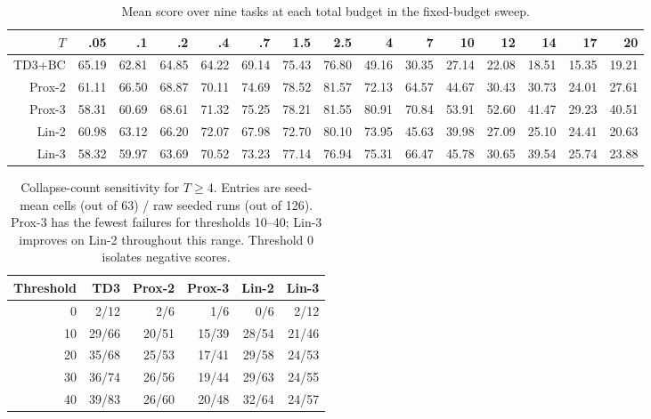 \documentclass[letterpaper]{article}
\begin{document}
\begin{table}[t]
\centering
\small
\setlength{\tabcolsep}{4.5pt}
\begin{tabular}{r|rrrrrrrrrrrrrr}
\toprule
$T$&.05&.1&.2&.4&.7&1.5&2.5&4&7&10&12&14&17&20\\
\midrule
TD3+BC&65.19&62.81&64.85&64.22&69.14&75.43&76.80&49.16&30.35&27.14&22.08&18.51&15.35&19.21\\
Prox-2&61.11&66.50&68.87&70.11&74.69&78.52&81.57&72.13&64.57&44.67&30.43&30.73&24.01&27.61\\
Prox-3&58.31&60.69&68.61&71.32&75.25&78.21&81.55&80.91&70.84&53.91&52.60&41.47&29.23&40.51\\
Lin-2&60.98&63.12&66.20&72.07&67.98&72.70&80.10&73.95&45.63&39.98&27.09&25.10&24.41&20.63\\
Lin-3&58.32&59.97&63.69&70.52&73.23&77.14&76.94&75.31&66.47&45.78&30.65&39.54&25.74&23.88\\
\bottomrule
\end{tabular}
\caption{Mean score over nine tasks at each total budget in the fixed-budget sweep.}
\label{tab:tau_means}
\end{table}

\begin{table}[t]
\centering
\small
\begin{tabular}{r|rrrrr}
\toprule
Threshold & TD3 & Prox-2 & Prox-3 & Lin-2 & Lin-3\\
\midrule
0  & 2/12  & 2/6  & 1/6  & 0/6  & 2/12\\
10 & 29/66 & 20/51 & 15/39 & 28/54&21/46\\
20 & 35/68 & 25/53 & 17/41 & 29/58&24/53\\
30 & 36/74 & 26/56 & 19/44 & 29/63&24/55\\
40 & 39/83 & 26/60 & 20/48 & 32/64&24/57\\
\bottomrule
\end{tabular}
\caption{Collapse-count sensitivity for $T\ge4$. Entries are seed-mean cells (out of 63) / raw seeded runs (out of 126). Prox-3 has the fewest failures for thresholds 10--40; Lin-3 improves on Lin-2 throughout this range. Threshold 0 isolates negative scores.}
\label{tab:collapse_sensitivity}
\end{table}
\end{document}
